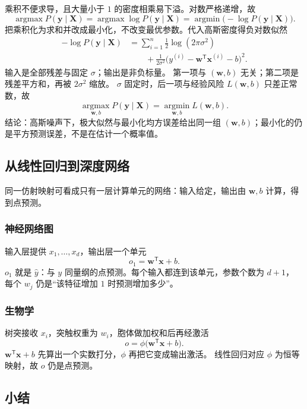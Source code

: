 乘积不便求导，且大量小于 $1$ 的密度相乘易下溢。对数严格递增，故
\[
\operatorname*{argmax}P(\bm{y}\mid\bm{X})
=
\operatorname*{argmax}\log P(\bm{y}\mid\bm{X})
=
\operatorname*{argmin}\bigl(-\log P(\bm{y}\mid\bm{X})\bigr).
\]
把乘积化为求和并改成最小化，不改变最优参数。代入高斯密度得负对数似然
\begin{align*}
-\log P(\bm{y}\mid\bm{X})
&=
\sum_{i=1}^{n}\frac{1}{2}\log(2\pi\sigma^{2})\\
&\qquad
+\frac{1}{2\sigma^{2}}\bigl(y^{(i)}-\bm{w}^{\mathsf T}\bm{x}^{(i)}-b\bigr)^{2}.
\end{align*}
输入是全部残差与固定 $\sigma$；输出是非负标量。
第一项与 $(\bm{w},b)$ 无关；第二项是残差平方和，再被 $2\sigma^{2}$ 缩放。
$\sigma$ 固定时，后一项与经验风险 $L(\bm{w},b)$ 只差正常数，故
\[
\operatorname*{argmax}_{\bm{w},b}P(\bm{y}\mid\bm{X})
=
\operatorname*{argmin}_{\bm{w},b}L(\bm{w},b).
\]
结论：高斯噪声下，极大似然与最小化均方误差给出同一组 $(\bm{w},b)$；最小化的仍是平方预测误差，不是在估计一个概率值。

\subsection{从线性回归到深度网络}

同一仿射映射可看成只有一层计算单元的网络：输入给定，输出由 $\bm{w},b$ 计算，得到点预测。

\subsubsection{神经网络图}

输入层提供 $x_{1},\ldots,x_{d}$，输出层一个单元
\[
o_{1}=\bm{w}^{\mathsf T}\bm{x}+b.
\]
$o_1$ 就是 $\hat{y}$：与 $y$ 同量纲的点预测。每个输入都连到该单元，参数个数为 $d+1$，
每个 $w_j$ 仍是“该特征增加 $1$ 时预测增加多少”。

\subsubsection{生物学}

树突接收 $x_{i}$，突触权重为 $w_{i}$，胞体做加权和后再经激活
\[
o=\phi\bigl(\bm{w}^{\mathsf T}\bm{x}+b\bigr).
\]
$\bm{w}^{\mathsf T}\bm{x}+b$ 先算出一个实数打分，$\phi$ 再把它变成输出激活。
线性回归对应 $\phi$ 为恒等映射，故 $o$ 仍是点预测。

\subsection{小结}


